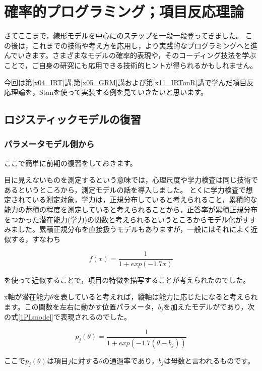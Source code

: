 \documentclass{ltjsbook}
\begin{document}
\chapter{確率的プログラミング；項目反応理論}
\label{x27_IRTonBayes}
さてここまで，線形モデルを中心にのステップを一段一段登ってきました。
この後は，これまでの技術や考え方を応用し，より実践的なプログラミングへと進んでいきます。さまざまなモデルの確率的表現や，そのコーディング技法を学ぶことで，ご自身の研究にも応用できる技術的ヒントが得られるかもしれません。

今回は第\ref{x04_IRT}講,第\ref{x05_GRM}講および第\ref{x11_IRTonR}講で学んだ項目反応理論を，Stanを使って実装する例を見ていきたいと思います。
\section{ロジスティックモデルの復習}
\subsection{パラメータモデル側から}
ここで簡単に前期の復習をしておきます。

目に見えないものを測定するという意味では，心理尺度や学力検査は同じ技術であるというところから，測定モデルの話を導入しました。
とくに学力検査で想定されている測定対象，学力は，正規分布していると考えられること，累積的な能力の蓄積の程度を測定していると考えられることから，正答率が累積正規分布をつかった潜在能力(学力)の関数と考えられるというところからモデル化がすすみました。累積正規分布を直接扱うモデルもありますが，一般にはそれによく近似する，すなわち

\[ f(x) = \frac{1}{1+exp(-1.7x)}\]

を使って近似することで，項目の特徴を描写することが考えられたのでした。

x軸が潜在能力$\theta$を表していると考えれば，縦軸は能力に応じたになると考えられます。この関数を左右に動かす位置パラメータ，$b_j$を加えたモデルがであり，次の式\ref{1PLmodel}で表現されるのでした。

\begin{equation}     
  p_j(\theta) = \frac{1}{1+exp(-1.7(\theta-b_j))} 
  \label{1PLmodel}
\end{equation}

ここで$p_j(\theta)$は項目$j$に対する$\theta$の通過率であり，$b_j$は母数と言われるものです。
\end{document}

